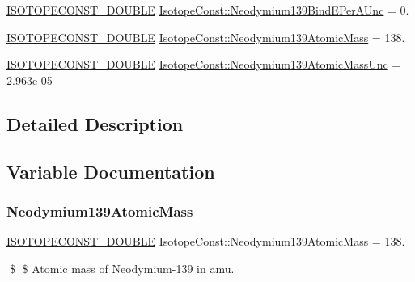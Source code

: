\begin{DoxyCompactItemize}
\mbox{\hyperlink{group___isotope_const-_macros_ga8f45a7272ce02c0b4c65c44636ed719a}{I\+S\+O\+T\+O\+P\+E\+C\+O\+N\+S\+T\+\_\+\+D\+O\+U\+B\+LE}} \mbox{\hyperlink{group___isotope_const-_neodymium-_nd139_ga0114d1e3c2cabcc126032a2caee794c2}{Isotope\+Const\+::\+Neodymium139\+Bind\+E\+Per\+A\+Unc}} = 0.
\item 
\mbox{\hyperlink{group___isotope_const-_macros_ga8f45a7272ce02c0b4c65c44636ed719a}{I\+S\+O\+T\+O\+P\+E\+C\+O\+N\+S\+T\+\_\+\+D\+O\+U\+B\+LE}} \mbox{\hyperlink{group___isotope_const-_neodymium-_nd139_ga0fc3c3fd12c5647f64b5725799a28722}{Isotope\+Const\+::\+Neodymium139\+Atomic\+Mass}} = 138.
\item 
\mbox{\hyperlink{group___isotope_const-_macros_ga8f45a7272ce02c0b4c65c44636ed719a}{I\+S\+O\+T\+O\+P\+E\+C\+O\+N\+S\+T\+\_\+\+D\+O\+U\+B\+LE}} \mbox{\hyperlink{group___isotope_const-_neodymium-_nd139_ga0000e2403353daf96198d2556315827d}{Isotope\+Const\+::\+Neodymium139\+Atomic\+Mass\+Unc}} = 2.\+963e-\/05
\end{DoxyCompactItemize}


\subsection{Detailed Description}


\subsection{Variable Documentation}
\mbox{\label{group___isotope_const-_neodymium-_nd139_ga0fc3c3fd12c5647f64b5725799a28722}} 
\subsubsection{\texorpdfstring{Neodymium139\+Atomic\+Mass}{Neodymium139AtomicMass}}
{\footnotesize\ttfamily \mbox{\hyperlink{group___isotope_const-_macros_ga8f45a7272ce02c0b4c65c44636ed719a}{I\+S\+O\+T\+O\+P\+E\+C\+O\+N\+S\+T\+\_\+\+D\+O\+U\+B\+LE}} Isotope\+Const\+::\+Neodymium139\+Atomic\+Mass = 138.}

\$ \$ Atomic mass of Neodymium-\/139 in amu. \mbox{\label{group___isotope_const-_neodymium-_nd139_ga0000e2403353daf96198d2556315827d}} 
